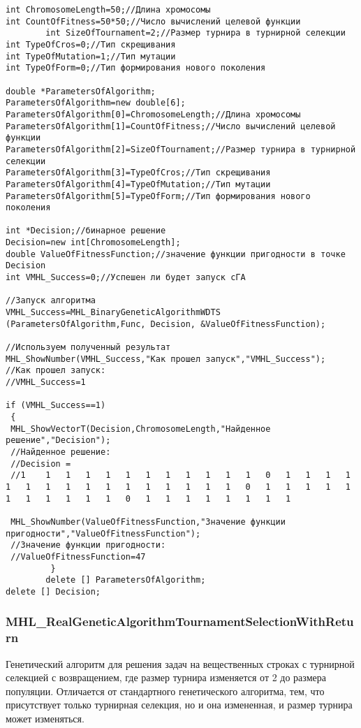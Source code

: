 \documentclass[a4paper,12pt]{article}
\begin{document}
\begin{lstlisting}[label=code_use_MHL_BinaryGeneticAlgorithmWDTS,caption=Пример использования]
int ChromosomeLength=50;//Длина хромосомы
int CountOfFitness=50*50;//Число вычислений целевой функции
		int SizeOfTournament=2;//Размер турнира в турнирной селекции
int TypeOfCros=0;//Тип скрещивания
int TypeOfMutation=1;//Тип мутации
int TypeOfForm=0;//Тип формирования нового поколения

double *ParametersOfAlgorithm;
ParametersOfAlgorithm=new double[6];
ParametersOfAlgorithm[0]=ChromosomeLength;//Длина хромосомы
ParametersOfAlgorithm[1]=CountOfFitness;//Число вычислений целевой функции
ParametersOfAlgorithm[2]=SizeOfTournament;//Размер турнира в турнирной селекции
ParametersOfAlgorithm[3]=TypeOfCros;//Тип скрещивания
ParametersOfAlgorithm[4]=TypeOfMutation;//Тип мутации
ParametersOfAlgorithm[5]=TypeOfForm;//Тип формирования нового поколения

int *Decision;//бинарное решение
Decision=new int[ChromosomeLength];
double ValueOfFitnessFunction;//значение функции пригодности в точке Decision
int VMHL_Success=0;//Успешен ли будет запуск cГА

//Запуск алгоритма
VMHL_Success=MHL_BinaryGeneticAlgorithmWDTS (ParametersOfAlgorithm,Func, Decision, &ValueOfFitnessFunction);

//Используем полученный результат
MHL_ShowNumber(VMHL_Success,"Как прошел запуск","VMHL_Success");
//Как прошел запуск:
//VMHL_Success=1

if (VMHL_Success==1)
 {
 MHL_ShowVectorT(Decision,ChromosomeLength,"Найденное решение","Decision");
 //Найденное решение:
 //Decision =
 //1	1	1	1	1	1	1	1	1	1	1	1	0	1	1	1	1	1	1	1	1	1	1	1	1	1	1	1	1	0	1	1	1	1	1	1	1	1	1	1	1	0	1	1	1	1	1	1	1	1

 MHL_ShowNumber(ValueOfFitnessFunction,"Значение функции пригодности","ValueOfFitnessFunction");
 //Значение функции пригодности:
 //ValueOfFitnessFunction=47
		 }
		delete [] ParametersOfAlgorithm;
delete [] Decision;
\end{lstlisting}

\subsubsection{MHL\_RealGeneticAlgorithmTournamentSelectionWithReturn}\label{MHL_RealGeneticAlgorithmTournamentSelectionWithReturn}

Генетический алгоритм для решения задач на вещественных строках  с турнирной селекцией с возвращением, где размер турнира изменяется от 2 до размера популяции.
Отличается от стандартного генетического алгоритма, тем, что присутствует только турнирная селекция, но и она измененная, и размер турнира может изменяться.
\end{document}
